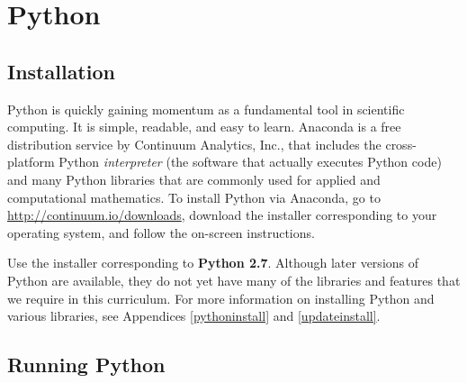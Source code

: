 \label{lab:Essential_Python}


\section*{Python} %

\subsection*{Installation} %

Python is quickly gaining momentum as a fundamental tool in scientific computing.
It is simple, readable, and easy to learn.
Anaconda is a free distribution service by Continuum Analytics, Inc., that includes the cross-platform Python \emph{interpreter} (the software that actually executes Python code) and many Python libraries that are commonly used for applied and computational mathematics.
To install Python via Anaconda, go to \url{http://continuum.io/downloads}, download the installer corresponding to your operating system, and follow the on-screen instructions. 

Use the installer corresponding to \textbf{Python 2.7}.
Although later versions of Python are available, they do not yet have many of the libraries and features that we require in this curriculum.
For more information on installing Python and various libraries, see Appendices \ref{pythoninstall} and \ref{updateinstall}.

\subsection*{Running Python} %

